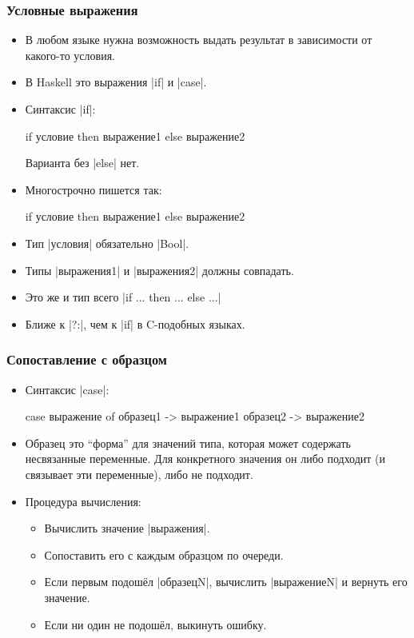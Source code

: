\documentclass[10pt]{beamer}
\begin{document}
\begin{frame}[fragile]
  \frametitle{Условные выражения}
  \begin{itemize}
    \item В любом языке нужна возможность выдать результат в зависимости от какого-то условия.
    \item В Haskell это выражения \haskinline|if| и \haskinline|case|.
    \item Синтаксис \haskinline|if|:
          \begin{haskell}
            if условие then выражение1 else выражение2
          \end{haskell}
          Варианта без \haskinline|else| нет.
    \item Многострочно пишется так:
          \begin{haskell}
            if условие 
                then выражение1 
                else выражение2
          \end{haskell}
    \item Тип \haskinline|условия| обязательно \haskinline|Bool|.
    \item Типы \haskinline|выражения1| и \haskinline|выражения2| должны совпадать.
    \item Это же и тип всего  \haskinline|if ... then ... else ...|
    \item Ближе к \haskinline|?:|, чем к \haskinline|if| в C-подобных языках.
  \end{itemize}
\end{frame}

\begin{frame}[fragile]
  \frametitle{Сопоставление с образцом}
  \begin{itemize}
    \item Синтаксис \haskinline|case|: \\
          \begin{haskell}
            case выражение of 
                образец1 -> выражение1 
                образец2 -> выражение2
          \end{haskell}
    \item Образец это \enquote{форма} для значений типа, которая может содержать несвязанные переменные. Для конкретного значения он либо подходит (и связывает эти переменные), либо не подходит.
    \item Процедура вычисления:
          \begin{itemize}
            \item Вычислить значение \haskinline|выражения|.
            \item Сопоставить его с каждым образцом по очереди.
            \item Если первым подошёл \haskinline|образецN|, вычислить \haskinline|выражениеN| и вернуть его значение.
            \item Если ни один не подошёл, выкинуть ошибку.
          \end{itemize}
  \end{itemize}
\end{frame}
\end{document}
